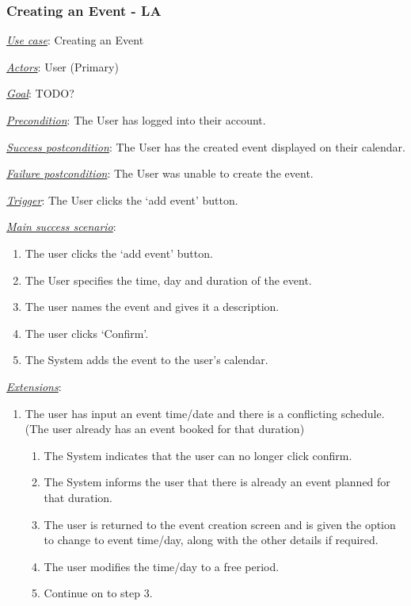 \documentclass[a4paper]{article}
\begin{document}
\subsubsection{Creating an Event - LA}
\underline{\textit{Use case}}: Creating an Event

\underline{\textit{Actors}}: User (Primary)

\underline{\textit{Goal}}: TODO? %

\underline{\textit{Precondition}}: The User has logged into their account.

\underline{\textit{Success postcondition}}: The User has the created event displayed on their calendar.

\underline{\textit{Failure postcondition}}: The User was unable to create the event.

\underline{\textit{Trigger}}: The User clicks the ‘add event’ button.

\underline{\textit{Main success scenario}}: 
\begin{enumerate}[leftmargin = 3em]
    \item The user clicks the ‘add event’ button.
    \item The User specifies the time, day and duration of the event.
    \item The user names the event and gives it a description.
    \item The user clicks ‘Confirm’.
    \item The System adds the event to the user’s calendar.
\end{enumerate} 

\underline{\textit{Extensions}}:
\begin{enumerate}[label=2\alph*, leftmargin = 3em]
    \item The user has input an event time/date and there is a conflicting schedule. (The user already has an event booked for that duration) \begin{enumerate}[label=\arabic*.]
        \item The System indicates that the user can no longer click confirm.
        \item The System informs the user that there is already an event planned for that duration.
        \item The user is returned to the event creation screen and is given the option to change to event time/day, along with the other details if required.
        \item The user modifies the time/day to a free period.
        \item Continue on to step 3.
    \end{enumerate}
\end{enumerate}
\end{document}
